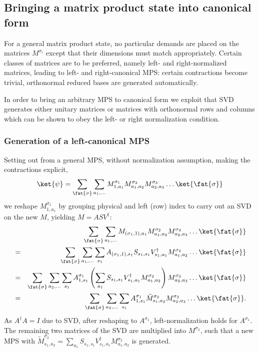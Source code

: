 \subsection{Bringing a matrix product state into canonical form}

For a general matrix product state, no particular demands are placed on the matrices $M^{\sigma_i}$ except that their dimensions must match appropriately. Certain classes of matrices are to be preferred, namely left- and right-normalized matrices, leading to left- and right-canonical MPS: certain contractions become trivial, orthonormal reduced bases are generated automatically.

In order to bring an arbitrary MPS to canonical form we exploit that SVD generates either unitary matrices or matrices with orthonormal rows and columns which can be shown to obey the left- or right normalization condition.

\subsubsection{Generation of a left-canonical MPS}
Setting out from a general MPS, without normalization assumption, making the contractions explicit,
\begin{equation}
\ket{\psi}= \sum_{\fat{\sigma}} \sum_{a_1,\ldots} M^{\sigma_ 1}_{1,a_1} M^{\sigma_2}_{a_1,a_2} M^{\sigma_3}_{a_2,a_3} \ldots \ket{\fat{\sigma}}
\end{equation}
we reshape $M^{\sigma_ 1}_{1,a_1}$ by grouping physical and left (row) index to carry out an SVD on the new $M$, yielding $M=ASV^\dagger$:
\begin{eqnarray}
& & \sum_{\fat{\sigma}} \sum_{a_1,\ldots} M_{(\sigma_ 1,1),a_1} M^{\sigma_2}_{a_1,a_2} M^{\sigma_3}_{a_2,a_3} \ldots \ket{\fat{\sigma}} \nonumber \\
&=&  \sum_{\fat{\sigma}} \sum_{a_1,\ldots} \sum_{s_1} A_{(\sigma_ 1,1),s_1} S_{s_1,s_1} V^\dagger_{s_1,a_1}  M^{\sigma_2}_{a_1,a_2}  \ldots \ket{\fat{\sigma}} \nonumber \\
&=& \sum_{\fat{\sigma}} \sum_{a_2,\ldots} \sum_{s_1} A^{\sigma_1}_{1,s_1} \left( \sum_{a_1} S_{s_1,s_1} V^\dagger_{s_1,a_1}  M^{\sigma_2}_{a_1,a_2} \right) M^{\sigma_3}_{a_2,a_3} \ldots \ket{\fat{\sigma}} \nonumber \\
&=& \sum_{\fat{\sigma}} \sum_{a_2,\ldots} \sum_{s_1} A^{\sigma_1}_{1,s_1} \tilde{M}^{\sigma_2}_{s_1,a_2} M^{\sigma_3}_{a_2,a_3} \ldots \ket{\fat{\sigma}} .
\end{eqnarray}
As $A^\dagger A = I$ due to SVD, after reshaping to $A^{\sigma_1}$, left-normalization holds for  $A^{\sigma_1}$. The remaining two matrices of the SVD are multiplied into $M^{\sigma_2}$, such that a new MPS with
$\tilde{M}^{\sigma_2}_{s_1,a_2} = \sum_{a_1} S_{s_1,s_1} V^\dagger_{s_1,a_1}  M^{\sigma_2}_{a_1,a_2}$ is generated. 

